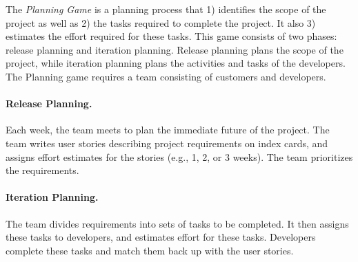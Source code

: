 The \emph{Planning Game} is a planning process that 1) identifies
the scope of the project as well as 2) the tasks required to complete
the project. It also 3) estimates the effort required for these tasks.
This game consists of two phases: release planning and iteration planning.
Release planning plans the scope of the project, while iteration
planning plans the activities and tasks of the developers. The Planning
game requires a team consisting of customers and developers.

\paragraph{Release Planning.} 
Each week, the team meets to plan the immediate future of the project.
The team writes user stories describing project requirements on index cards,
and assigns effort estimates for the stories (e.g., 1, 2, or 3 weeks).
The team prioritizes the requirements.

\paragraph{Iteration Planning.} 
The team divides requirements into sets of tasks to be completed.
It then assigns these tasks to developers, and estimates effort
for these tasks. Developers complete these tasks and match them
back up with the user stories.





